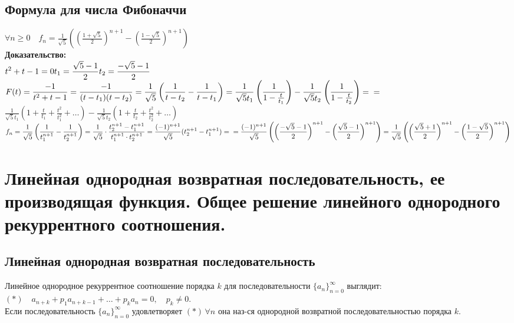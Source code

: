 \documentclass[12pt]{article}
\begin{document}
\subsection{Формула для числа Фибоначчи}
		$ \displaystyle  \forall n \ge 0 \quad f_n = \frac{1}{\sqrt{5}}\left(\left(\frac{1+\sqrt{5}}{2}\right)^{n+1} - \left(\frac{1-\sqrt{5}}{2}\right)^{n+1}\right)$\\
		\textbf{Доказательство:}\\
		$ \displaystyle  t^2 +t-1 = 0\\
		t_1 = \frac{\sqrt{5}-1}{2}\\
		t_2 = \frac{-\sqrt{5}-1}{2}$\\
		
		$ \displaystyle F(t) = \frac{-1}{t^2 + t - 1} = \frac{-1}{(t-t_1)(t-t_2)} = \frac{1}{\sqrt{5}}\left( \frac{1}{t-t_2} - \frac{1}{t-t_1} \right) =
		\frac{1}{\sqrt{5}t_1}\left(\frac{1}{1-\frac{t}{t_1}}\right) - \frac{1}{\sqrt{5}t_2}\left(\frac{1}{1-\frac{t}{t_2}}\right) =\\=$
		$ \displaystyle \frac{1}{\sqrt{5}t_1}\left(1 + \frac{t}{t_1} + \frac{t^2}{t_1^2} +  \ldots \right) -
		\frac{1}{\sqrt{5}t_2}\left(1 + \frac{t}{t_2}+ \frac{t^2}{t_2^2} +  \ldots \right) $\\
		
		$ \displaystyle f_n = \frac{1}{\sqrt{5}}\left(\frac{1}{t_1^{n+1}} - \frac{1}{t_2^{n+1}}\right) =
		\frac{1}{\sqrt{5}}\cdot \frac{t_2^{n+1} - t_1^{n+1}}{t_1^{n+1}\cdot t_2^{n+1}} =
		\frac{(-1)^{n+1}}{\sqrt{5}}(t_2^{n+1} - t_1^{n+1}) = \\ =
		\frac{(-1)^{n+1}}{\sqrt{5}}\left( \left(\frac{-\sqrt{5}-1}{2}\right)^{n+1} - \left(\frac{\sqrt{5}-1}{2}\right)^{n+1} \right) =
		\frac{1}{\sqrt{5}}\left( \left(\frac{\sqrt{5}+1}{2}\right)^{n+1} - \left(\frac{1-\sqrt{5}}{2}\right)^{n+1} \right) $\\
		\qedsymbol

\section{Линейная однородная возвратная последовательность, ее производящая функция. Общее решение линейного однородного рекуррентного соотношения.}
\subsection{Линейная однородная возвратная последовательность}
	Линейное однородное рекуррентное соотношение порядка $k$ для последовательности $\{ a_n \}_{n=0}^\infty$ выглядит:\\
	$(*) \quad a_{n+k} + p_1 a_{n+k-1} +  \ldots  + p_k a_n = 0, \quad p_k \ne 0$.\\
	Если последовательность $\{ a_n \}_{n=0}^\infty$ удовлетворяет $(*)\, \forall n$ она наз-ся однородной возвратной последовательностью порядка $k$.\\
\end{document}
